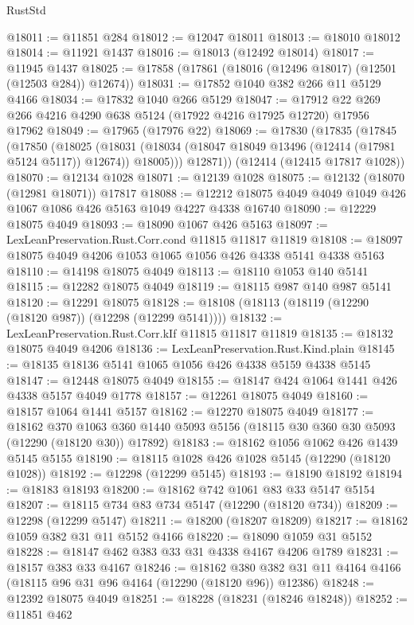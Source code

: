 \begin{lexlean}{RustStd}
\begin{coremodule}
{\begin{coremodule}
{{{{{{{{{{{{{{{{{{{{{{{{{{{{{{{{{{{{{{{{{{{{{{{{{{@18011 := @11851 @284
@18012 := @12047 @18011
@18013 := @18010 @18012
@18014 := @11921 @1437
@18016 := @18013 (@12492 @18014)
@18017 := @11945 @1437
@18025 := @17858 (@17861 (@18016 (@12496 @18017) (@12501 (@12503 @284)) @12674))
@18031 := @17852 @1040 @382 @266 @11 @5129 @4166
@18034 := @17832 @1040 @266 @5129
@18047 := @17912 @22 @269 @266 @4216 @4290 @638 @5124 (@17922 @4216 @17925 @12720) @17956 @17962
@18049 := @17965 (@17976 @22)
@18069 := @17830
    (@17835
      (@17845
        (@17850
          (@18025
            (@18031 (@18034 (@18047 @18049 @13496 (@12414 (@17981 @5124 @5117)) @12674)) @18005)))
        @12871))
    (@12414 (@12415 @17817 @1028))
@18070 := @12134 @1028
@18071 := @12139 @1028
@18075 := @12132 (@18070 (@12981 @18071)) @17817
@18088 := @12212 @18075 @4049 @4049 @1049 @426 @1067 @1086 @426 @5163 @1049 @4227 @4338 @16740
@18090 := @12229 @18075 @4049
@18093 := @18090 @1067 @426 @5163
@18097 := LexLeanPreservation.Rust.Corr.cond @11815 @11817 @11819
@18108 := @18097 @18075 @4049 @4206 @1053 @1065 @1056 @426 @4338 @5141 @4338 @5163
@18110 := @14198 @18075 @4049
@18113 := @18110 @1053 @140 @5141
@18115 := @12282 @18075 @4049
@18119 := @18115 @987 @140 @987 @5141
@18120 := @12291 @18075
@18128 := @18108 (@18113 (@18119 (@12290 (@18120 @987)) (@12298 (@12299 @5141))))
@18132 := LexLeanPreservation.Rust.Corr.kIf @11815 @11817 @11819
@18135 := @18132 @18075 @4049 @4206
@18136 := LexLeanPreservation.Rust.Kind.plain
@18145 := @18135 @18136 @5141 @1065 @1056 @426 @4338 @5159 @4338 @5145
@18147 := @12448 @18075 @4049
@18155 := @18147 @424 @1064 @1441 @426 @4338 @5157 @4049 @1778
@18157 := @12261 @18075 @4049
@18160 := @18157 @1064 @1441 @5157
@18162 := @12270 @18075 @4049
@18177 := @18162
    @370
    @1063
    @360
    @1440
    @5093
    @5156
    (@18115 @30 @360 @30 @5093 (@12290 (@18120 @30)) @17892)
@18183 := @18162 @1056 @1062 @426 @1439 @5145 @5155
@18190 := @18115 @1028 @426 @1028 @5145 (@12290 (@18120 @1028))
@18192 := @12298 (@12299 @5145)
@18193 := @18190 @18192
@18194 := @18183 @18193
@18200 := @18162 @742 @1061 @83 @33 @5147 @5154
@18207 := @18115 @734 @83 @734 @5147 (@12290 (@18120 @734))
@18209 := @12298 (@12299 @5147)
@18211 := @18200 (@18207 @18209)
@18217 := @18162 @1059 @382 @31 @11 @5152 @4166
@18220 := @18090 @1059 @31 @5152
@18228 := @18147 @462 @383 @33 @31 @4338 @4167 @4206 @1789
@18231 := @18157 @383 @33 @4167
@18246 := @18162
    @380
    @382
    @31
    @11
    @4164
    @4166
    (@18115 @96 @31 @96 @4164 (@12290 (@18120 @96)) @12386)
@18248 := @12392 @18075 @4049
@18251 := @18228 (@18231 (@18246 @18248))
@18252 := @11851 @462
}}}}}}}}}}}}}}}}}}}}}}}}}}}}}}}}}}}}}}}}}}}}}}}}}}
\end{coremodule}}
\end{coremodule}
\end{lexlean}
